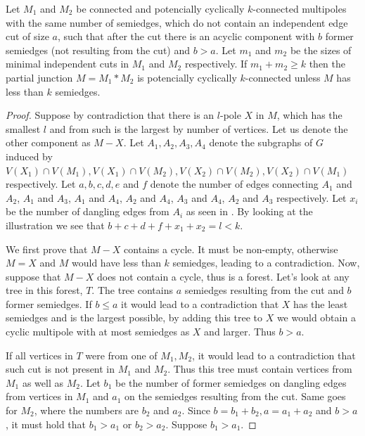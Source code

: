 \documentclass[12pt, twoside]{book}
\begin{document}
\begin{theorem}\label{th:connecting-potencially-k-connected}
	Let $M_1$ and $M_2$ be connected and potencially cyclically $k$-connected multipoles with the same number of semiedges, which do not contain an independent edge cut of size $a$, such that after the cut there is an acyclic component with $b$ former semiedges (not resulting from the cut) and $b>a$. Let $m_1$ and $m_2$ be the sizes of minimal independent cuts in $M_1$ and $M_2$ respectively. If $m_1+m_2\geq k$ then the partial junction $M=M_1*M_2$ is potencially cyclically $k$-connected unless $M$ has less than $k$ semiedges.
\end{theorem}

\begin{proof}
	Suppose by contradiction that there is an $l$-pole $X$ in $M$, which has the smallest $l$ and from such is the largest by number of vertices. Let us denote the other component as $M-X$. Let $A_1,A_2,A_3,A_4$ denote the subgraphs of $G$ induced by $V(X_1)\cap V(M_1), V(X_1)\cap V(M_2), V(X_2)\cap V(M_2), V(X_2)\cap V(M_1)$ respectively. Let $a,b,c,d,e$ and $f$ denote the number of edges connecting $A_1$ and $A_2$, $A_1$ and $A_3$, $A_1$ and $A_4$, $A_2$ and $A_4$, $A_3$ and $A_4$, $A_2$ and $A_3$ respectively. Let $x_i$ be the number of dangling edges from $A_i$ as seen in . By looking at the illustration we see that $b+c+d+f+x_1+x_2=l<k$.
	
	We first prove that $M-X$ contains a cycle. It must be non-empty, otherwise $M=X$ and $M$ would have less than $k$ semiedges, leading to a contradiction. Now, suppose that $M-X$ does not contain a cycle, thus is a forest. Let's look at any tree in this forest, $T$. The tree contains $a$ semiedges resulting from the cut and $b$ former semiedges. If $b\leq a$ it would lead to a contradiction that $X$ has the least semiedges and is the largest possible, by adding this tree to $X$ we would obtain a cyclic multipole with at most semiedges as $X$ and larger. Thus $b>a$. 
	
	If all vertices in $T$ were from one of $M_1,M_2$, it would lead to a contradiction that such cut is not present in $M_1$ and $M_2$. Thus this tree must contain vertices from $M_1$ as well as $M_2$. Let $b_1$ be the number of former semiedges on dangling edges from vertices in $M_1$ and $a_1$ on the semiedges resulting from the cut. Same goes for $M_2$, where the numbers are $b_2$ and $a_2$. Since $b=b_1+b_2, a=a_1+a_2$ and $b>a$, it must hold that $b_1>a_1$ or $b_2>a_2$.  Suppose $b_1>a_1$.
	

\end{proof}
\end{document}
